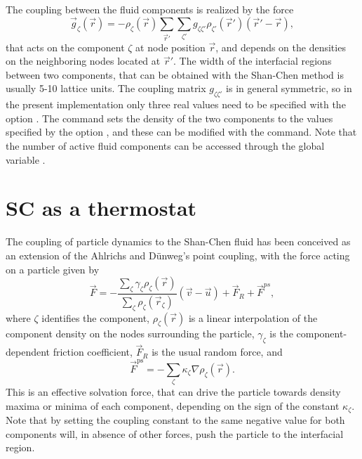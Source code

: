 The coupling between the fluid components
is realized by the force
\begin{equation}
 \vec{g}_{\zeta}(\vec{r}) =  - \rho_{\zeta}(\vec{r})
 \sum_{\vec{r}'}\sum_{\zeta'}  g_{\zeta \zeta'} \rho_{\zeta'}
 (\vec{r}') (\vec{r}'-\vec{r}),
\end{equation} that acts on the component $\zeta$ at node position
$\vec{r}$, and depends on the densities on the neighboring nodes
located at $\vec{r}'$.  The width of the interfacial regions between
two components, that can be obtained with the Shan-Chen method is
usually 5-10 lattice units.  The coupling matrix $g_{\zeta \zeta'}$
is in general symmetric, so in the present implementation only three
real values need to be specified with the option .
The  command sets the density of the two components
to the values specified by the option , and these can be
modified with the  command. Note that the number of
active fluid components can be accessed through the global variable
.


\section{SC as a thermostat\label{sec:scmd-coupling}}
The coupling of particle dynamics to the Shan-Chen fluid has been
conceived as an extension of the Ahlrichs and D\"unweg's point
coupling, with the force acting on a particle given by
\begin{equation}
  \vec{F} = -\frac{\sum_\zeta \gamma_\zeta \rho_\zeta(\vec{r})}{\sum_\zeta \rho_\zeta(\vec{r}_\zeta)} \left(\vec{v}-\vec{u}\right) + \vec{F}_R + \vec{F}^{ps},
\end{equation}
where $\zeta$ identifies the component, $\rho_\zeta(\vec{r})$ is a
linear interpolation of the component density on the nodes surrounding
the particle, $\gamma_\zeta$ is the component-dependent friction
coefficient, $\vec{F}_R$ is the usual random force, and
\begin{equation}
\vec{F}^{\mathrm{ps}}= -  \sum_{\zeta} \kappa_{\zeta} \nabla \rho_{\zeta}(\vec{r}).
\end{equation}
This is an effective solvation force, that can drive the particle
towards density maxima or minima of each component, depending on the
sign of the constant $\kappa_\zeta$. Note that by setting the coupling
constant to the same negative value for both components will, in
absence of other forces, push the particle to the interfacial region.

